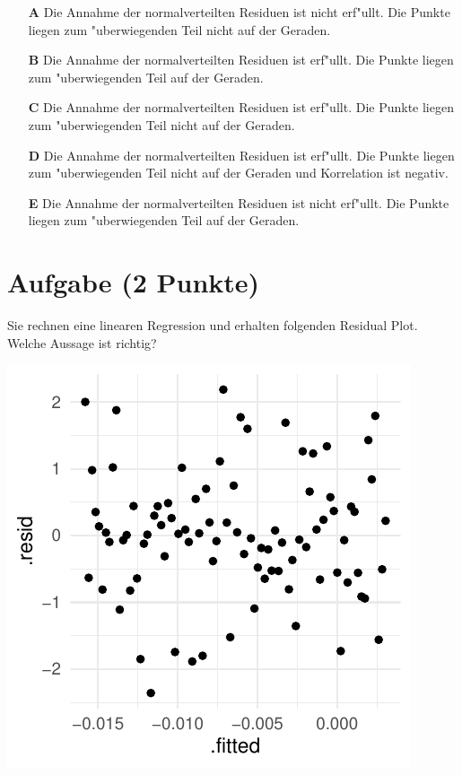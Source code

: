 \documentclass[a4paper, 9pt]{scrartcl}\usepackage[]{graphicx}\usepackage[]{xcolor}
\makeatletter
\def\maxwidth{ %
  \ifdim\Gin@nat@width>\linewidth
    \linewidth
  \else
    \Gin@nat@width
  \fi
}
\makeatother
\begin{document}
\begin{enumerate}
\item [\textbf{A} \msquare] Die Annahme der normalverteilten Residuen ist nicht erf{"u}llt. Die Punkte liegen zum {"u}berwiegenden Teil nicht auf der Geraden.
\item [\textbf{B} \msquare] Die Annahme der normalverteilten Residuen ist erf{"u}llt. Die Punkte liegen zum {"u}berwiegenden Teil auf der Geraden.
\item [\textbf{C} \msquare] Die Annahme der normalverteilten Residuen ist erf{"u}llt. Die Punkte liegen zum {"u}berwiegenden Teil nicht auf der Geraden.
\item [\textbf{D} \msquare] Die Annahme der normalverteilten Residuen ist erf{"u}llt. Die Punkte liegen zum {"u}berwiegenden Teil nicht auf der Geraden und Korrelation ist negativ.
\item [\textbf{E} \msquare] Die Annahme der normalverteilten Residuen ist nicht erf{"u}llt. Die Punkte liegen zum {"u}berwiegenden Teil auf der Geraden.
\end{enumerate}

\section{Aufgabe \hfill (2 Punkte)}

Sie rechnen eine linearen Regression und erhalten folgenden Residual
Plot. Welche Aussage ist richtig?




{\centering \includegraphics[width=\maxwidth]{img/mc-regression-06-a-1} 

}
\end{document}
